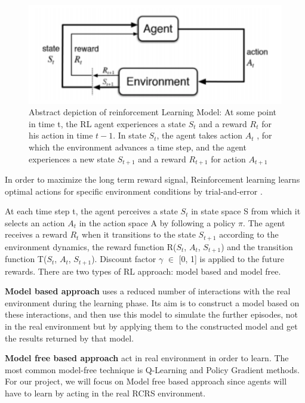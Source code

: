 \documentclass[12pt]{report}
\begin{document}
\begin{figure}[!h]
    \centering
    \includegraphics[width=12cm]{ReinforcementLearningModel.png}
    \caption{Abstract depiction of reinforcement Learning Model: At some point in time t, the RL agent experiences a state $S_t$ and a reward $R_t$ for his action in time $t-1$. In state $S_t$, the agent takes action $A_t$ , for which the environment advances a time step, and the agent experiences a new state $S_{t+1}$ and a reward $R_{t+1}$ for action $A_{t+1}$}
    \label{fig:ReinforcementLearningModel}
\end{figure}

In order to maximize the long term reward signal, Reinforcement learning learns optimal actions for specific environment conditions by trial-and-error \cite{Barto}. 

At each time step t, the agent perceives a state $S_t$ in state space S from which it selects an action $A_t$ in the action space A by following a policy $\pi$. The agent receives a reward $R_t$ when it transitions to the state $S_{t+1}$ according to the environment dynamics, the reward function R($S_t$, $A_t$, $S_{t+1}$) and the transition function T($S_t$, $A_t$, $S_{t+1}$). Discount factor $\gamma$ $\in$ [0, 1] is applied to the future rewards. There are two types of RL approach: model based and model free. 

\textbf{Model based approach} uses a reduced number of interactions with the real environment during the learning phase. Its aim is to construct a model based on these interactions, and then use this model to simulate the further episodes, not in the real environment but by applying them to the constructed model and get the results returned by that model.

\textbf{Model free based approach} act in real environment in order to learn. The most common model-free technique is Q-Learning and Policy Gradient methods. For our project, we will focus on Model free based approach since agents will have to learn by acting in the real RCRS environment. 
\end{document}
